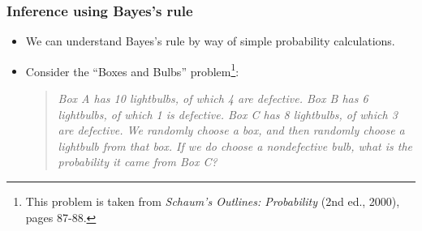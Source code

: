 \documentclass{slides}
\begin{document}
\begin{frame}
	\frametitle{Inference using Bayes's rule}

	\begin{itemize}

		\item We can understand Bayes's rule by way of simple probability calculations.
		\item Consider the ``Boxes and Bulbs'' problem\footnote{This problem is taken from \emph{Schaum's Outlines: Probability} (2nd ed., 2000), pages 87-88.}:

		\begin{quotation}
		{\itshape
		Box A has 10 lightbulbs, of which 4 are defective.
		Box B has 6 lightbulbs, of which 1 is defective.
		Box C has 8 lightbulbs, of which 3 are defective.
		We randomly choose a box, and then randomly choose a lightbulb from that box. 
		If we do choose a nondefective bulb, what is the probability it came from Box C?
		}
		\end{quotation}

	\end{itemize}

\end{frame}
\end{document}
